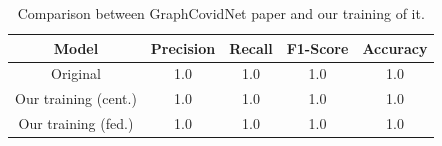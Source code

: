 \begin{table}[htbp]
    \small
    \centering
    \caption{Comparison between GraphCovidNet paper\cite{graph_covid_net} and our training of it.}
    \begin{tabular}{c|c|c|c|c}
        Model & Precision & Recall & F1-Score & Accuracy \\
        \hline
        Original & 1.0 & 1.0 & 1.0 & 1.0\\
        Our training (cent.) & 1.0 & 1.0 & 1.0 & 1.0\\
        Our training (fed.) & 1.0 & 1.0 & 1.0 & 1.0\\
    \end{tabular}
    \label{tab:results_graphcovidnet}
\end{table}

